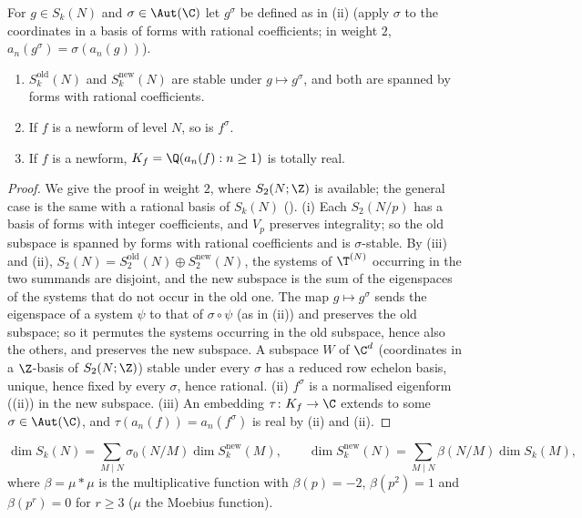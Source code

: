 \begin{corollary}\label{cor:hecke:galois-newforms}
For $g\in S_k(N)$ and $\sigma\in\Aut(\C)$ let $g^\sigma$ be defined as in (ii) (apply $\sigma$ to the coordinates in a basis of forms with rational
coefficients; in weight $2$, $a_n(g^\sigma)=\sigma(a_n(g))$).
\begin{enumerate}[label=(\roman*)]
\item $S_k^{\mathrm{old}}(N)$ and $S_k^{\mathrm{new}}(N)$ are stable under $g\mapsto g^\sigma$, and both are spanned by forms with rational coefficients.
\item If $f$ is a newform of level $N$, so is $f^\sigma$.
\item If $f$ is a newform, $K_f=\Q(a_n(f):n\ge1)$ is totally real.
\end{enumerate}
\end{corollary}

\begin{proof}
We give the proof in weight $2$, where $S_2(N;\Z)$ is available; the general case is the same with a rational basis of $S_k(N)$ (). (i) Each $S_2(N/p)$ has a basis of
forms with integer coefficients, and $V_p$ preserves integrality; so the old subspace is spanned by forms with rational coefficients and is $\sigma$-stable. By
(iii) and (ii), $S_2(N)=S_2^{\mathrm{old}}(N)\oplus S_2^{\mathrm{new}}(N)$, the systems of $\T^{(N)}$ occurring in the two summands are disjoint, and the new subspace is the
sum of the eigenspaces of the systems that do not occur in the old one. The map $g\mapsto g^\sigma$ sends the eigenspace of a system $\psi$ to that of $\sigma\circ\psi$ (as in
(ii)) and preserves the old subspace; so it permutes the systems occurring in the old subspace, hence also the others, and preserves the new
subspace. A subspace $W$ of $\C^d$ (coordinates in a $\Z$-basis of $S_2(N;\Z)$) stable under every $\sigma$ has a reduced row echelon basis, unique, hence fixed by every $\sigma$, hence
rational. (ii) $f^\sigma$ is a normalised eigenform ((ii)) in the new subspace. (iii) An embedding $\tau\colon K_f\to\C$ extends to some $\sigma\in\Aut(\C)$, and
$\tau(a_n(f))=a_n(f^\sigma)$ is real by (ii) and (ii).
\end{proof}

\begin{corollary}[dimensions]\label{cor:hecke:dimensions}
\[
\dim S_k(N)=\sum_{M\mid N}\sigma_0(N/M)\dim S_k^{\mathrm{new}}(M),\qquad\dim S_k^{\mathrm{new}}(N)=\sum_{M\mid N}\beta(N/M)\dim S_k(M),
\]
where $\beta=\mu*\mu$ is the multiplicative function with $\beta(p)=-2$, $\beta(p^2)=1$ and $\beta(p^r)=0$ for $r\ge3$ ($\mu$ the Moebius function).
\end{corollary}

